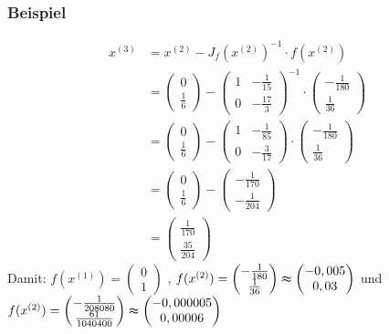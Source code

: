 \begin{frame}\frametitle{Beispiel}
\begin{align*}
x^{(3)}&=x^{(2)} - J_f(x^{(2)})^{-1}\cdot f(x^{(2)})\\
&=\begin{pmatrix} 0 \\\frac{1}{6}  \end{pmatrix} - \begin{pmatrix}1 &-\frac{1}{15}\\0  & -\frac{17}{3} \end{pmatrix}^{-1}\cdot \begin{pmatrix} -\frac{1}{180} \\ \frac{1}{36} \end{pmatrix} \\
&=\begin{pmatrix} 0 \\\frac{1}{6}  \end{pmatrix} - \begin{pmatrix}1 & -\frac{1}{85}\\0 & -\frac{3}{17} \end{pmatrix}\cdot \begin{pmatrix} -\frac{1}{180} \\\frac{1}{36} \end{pmatrix}\\
&=\begin{pmatrix} 0 \\\frac{1}{6} \end{pmatrix}-\begin{pmatrix} -\frac{1}{170} \\-\frac{1}{204} \end{pmatrix}\\
&=\begin{pmatrix} \frac{1}{170} \\\frac{35}{204} \end{pmatrix}
\end{align*}
\pause
Damit: $f(x^{(1)})=\begin{pmatrix}0 \\1 \end{pmatrix}$ \pause , $f(x^{(2)})=\begin{pmatrix}-\frac{1}{180} \\ \frac{1}{36} \end{pmatrix} \thickapprox \begin{pmatrix}-0,005 \\ 0,03 \end{pmatrix} $ \pause und $f(x^{(2)})=\begin{pmatrix}- \frac{1}{208080} \\\frac{61}{1040400} \end{pmatrix}\thickapprox \begin{pmatrix}-0,000005 \\ 0,00006 \end{pmatrix} $
\end{frame}

